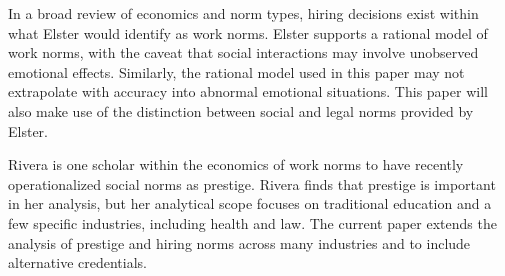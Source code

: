 
In a broad review of economics and norm types, hiring decisions exist within what Elster would identify as work norms\cite{elster1989social}.
Elster supports a rational model of work norms, with the caveat that social interactions may involve unobserved emotional effects.
Similarly, the rational model used in this paper may not extrapolate with accuracy into abnormal emotional situations.
This paper will also make use of the distinction between social and legal norms provided by Elster.

Rivera is one scholar within the economics of work norms to have recently operationalized social norms as prestige\cite{rivera2016pedigree}.
Rivera finds that prestige is important in her analysis, but her analytical scope focuses on traditional education and a few specific industries, including health and law.
The current paper extends the analysis of prestige and hiring norms
across many industries and to include alternative credentials.



